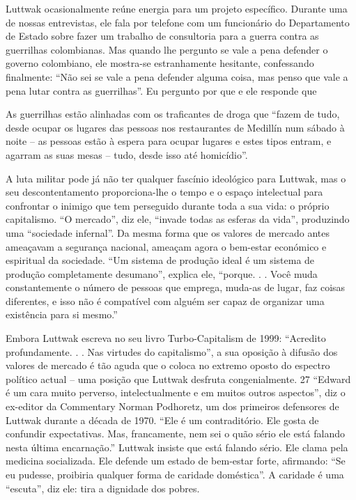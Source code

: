  \par 
Luttwak ocasionalmente reúne energia para um projeto específico. Durante uma de nossas entrevistas, ele fala por telefone com um funcionário do Departamento de Estado sobre fazer um trabalho de consultoria para a guerra contra as guerrilhas colombianas. Mas quando lhe pergunto se vale a pena defender o governo colombiano, ele mostra-se estranhamente hesitante, confessando finalmente: “Não sei se vale a pena defender alguma coisa, mas penso que vale a pena lutar contra as guerrilhas”. Eu pergunto por que e ele responde que
 \par 
As guerrilhas estão alinhadas com os traficantes de droga que “fazem de tudo, desde ocupar os lugares das pessoas nos restaurantes de Medillín num sábado à noite – as pessoas estão à espera para ocupar lugares e estes tipos entram, e agarram as suas mesas – tudo, desde isso até homicídio”.
 \par 
A luta militar pode já não ter qualquer fascínio ideológico para Luttwak, mas o seu descontentamento proporciona-lhe o tempo e o espaço intelectual para confrontar o inimigo que tem perseguido durante toda a sua vida: o próprio capitalismo. “O mercado”, diz ele, “invade todas as esferas da vida”, produzindo uma “sociedade infernal”. Da mesma forma que os valores de mercado antes ameaçavam a segurança nacional, ameaçam agora o bem-estar económico e espiritual da sociedade. “Um sistema de produção ideal é um sistema de produção completamente desumano”, explica ele, “porque. . . Você muda constantemente o número de pessoas que emprega, muda-as de lugar, faz coisas diferentes, e isso não é compatível com alguém ser capaz de organizar uma existência para si mesmo.”
 \par 
Embora Luttwak escreva no seu livro Turbo-Capitalism de 1999: “Acredito profundamente. . . Nas virtudes do capitalismo”, a sua oposição à difusão dos valores de mercado é tão aguda que o coloca no extremo oposto do espectro político actual – uma posição que Luttwak desfruta congenialmente. {\color{blue}27} “Edward é um cara muito perverso, intelectualmente e em muitos outros aspectos”, diz o ex-editor da Commentary Norman Podhoretz, um dos primeiros defensores de Luttwak durante a década de 1970. “Ele é um contraditório. Ele gosta de confundir expectativas. Mas, francamente, nem sei o quão sério ele está falando nesta última encarnação.” Luttwak insiste que está falando sério. Ele clama pela medicina socializada. Ele defende um estado de bem-estar forte, afirmando: “Se eu pudesse, proibiria qualquer forma de caridade doméstica”. A caridade é uma “escuta”, diz ele: tira a dignidade dos pobres.
